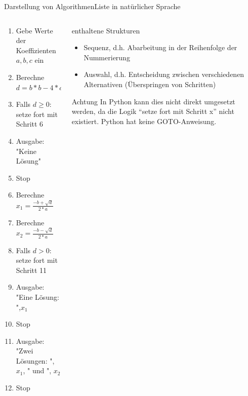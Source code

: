\documentclass[xelatex,aspectratio=169]{beamer}
\begin{document}
\begin{frame}{Darstellung von Algorithmen}{Liste in natürlicher Sprache}
  \vspace{-1em}
  \begin{columns}
    \begin{column}{.5\linewidth}
      \begin{enumerate}
        \item Gebe Werte der Koeffizienten $a,b,c$ ein
        \item Berechne $d = b*b - 4*a*c$
        \item Falls $d \geq 0$: setze fort mit Schritt 6
        \item Ausgabe: "Keine Lösung"
        \item Stop
        \item Berechne $x_1 = \frac{-b + \sqrt{d}}{2*a}$
        \item Berechne $x_2 = \frac{-b - \sqrt{d}}{2*a}$
        \item Falls $d > 0$: setze fort mit Schritt 11
        \item Ausgabe: "Eine Lösung: ",$x_1$
        \item Stop
        \item Ausgabe: "Zwei Lösungen: ",$x_1$, " und ", $x_2$
        \item Stop
      \end{enumerate}
    \end{column}
    \begin{column}{.5\linewidth}
      \begin{block}{enthaltene Strukturen}
        \begin{itemize}
          \item Sequenz, d.h. Abarbeitung in der Reihenfolge der Nummerierung
          \item Auswahl, d.h. Entscheidung zwischen verschiedenen Alternativen (Überspringen von Schritten)
        \end{itemize}
      \end{block}
      \begin{alertblock}{Achtung}
        In Python kann dies nicht direkt umgesetzt werden, da die Logik \enquote{setze fort mit Schritt x} nicht existiert. Python hat keine GOTO-Anweisung.
      \end{alertblock}
    \end{column}
  \end{columns}
\end{frame}
\end{document}
